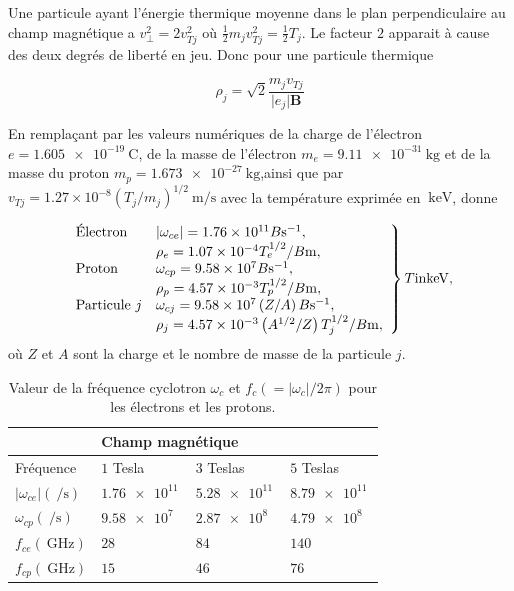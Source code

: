 \documentclass[main.tex]{subfiles}
\begin{document}
Une particule ayant l'énergie thermique moyenne dans le plan perpendiculaire au champ magnétique a \( v_\perp^2 = 2 v_{Tj}^2 \) où \( \frac{1}{2} m_j v_{Tj}^2 = \frac{1}{2} T_j \).
Le facteur \( 2 \) apparait à cause des deux degrés de liberté en jeu.
Donc pour une particule thermique

\begin{equation}
	\rho_j = \sqrt{2} \frac{m_j v_{Tj}}{\vert e_j \vert \bm{B}}
	\label{eq:rayon_larmor}
\end{equation}

En remplaçant par les valeurs numériques de la charge de l'électron \( e = \SI{1.605e-19}{\coulomb} \), de la masse de l'électron \( m_e = \SI{9.11e-31}{\kilogram} \) et de la masse du proton \( m_p = \SI{1.673e-27}{\kilogram} \),ainsi que par \( v_{Tj} = 1.27 \times 10^{-8} \left( T_j / m_j \right)^{1/2} \SI{}{\meter\per\second} \) avec la température exprimée en \( \SI {}{\kilo\electronvolt}\), donne

\[
	\left. \begin{array}{l l}
		\text{Électron} & \left\vert \omega_{ce} \right\vert = 1.76 \times 10^{11} B \SI{}{\per\second},\\
		 & \rho_e = 1.07 \times 10^{-4} T_e^{1/2}/ B \SI{}{\meter},\\
		 \text{Proton} & \omega_{cp} = 9.58 \times 10^{7} B \SI{}{\per\second},\\
		  & \rho_p = 4.57\times 10^{-3} T_p^{1/2}/B \SI{}{\meter},\\
		  \text{Particule } j & \omega_{cj} = 9.58 \times 10^{7} \left( Z/A\right) B \SI{}{\per\second},\\
		  & \rho_j = 4.57\times 10^{-3} \left(A^{1/2}/Z\right) T_j^{1/2}/B \SI{}{\meter},
	\end{array} \right\rbrace T \text{in} \SI{}{\kilo\electronvolt},
\]
où \( Z \) et \( A \) sont la charge et le nombre de masse de la particule \( j \).

\begin{table}
	\centering
	\begin{tabular}{llll}
\hline 
 & \multicolumn{3}{l}{Champ magnétique}\\ 
\hline 
Fréquence & \( 1 \) Tesla & \( 3 \) Teslas & \( 5 \) Teslas \\ 
\hline 
\(  \left\vert \omega_{ce} \right\vert (\SI{}{\per\second}) \) & \( \SI{1.76e11}{} \) & \( \SI{5.28e11}{} \) & \( \SI{8.79e11}{} \) \\ 
\( \omega_{cp} (\SI{}{\per\second}) \) & \( \SI{9.58e7}{} \) & \( \SI{2.87e8}{} \) & \( \SI{4.79e8}{} \) \\ 
\( f_{ce} ( \SI{}{\giga\hertz}) \) & \( 28 \) & \( 84 \) & \( 140 \) \\ 
\( f_{cp} ( \SI{}{\giga\hertz}) \) & \( 15 \) & \( 46 \) & \( 76 \) \\ 
\hline 
\end{tabular} 
\caption{Valeur de la fréquence cyclotron \( \omega_c \) et \( f_c( =\vert \omega_c\vert/2\pi) \) pour les électrons et les protons.}
\label{tab:frequence_larmor}
\end{table}
\end{document}
